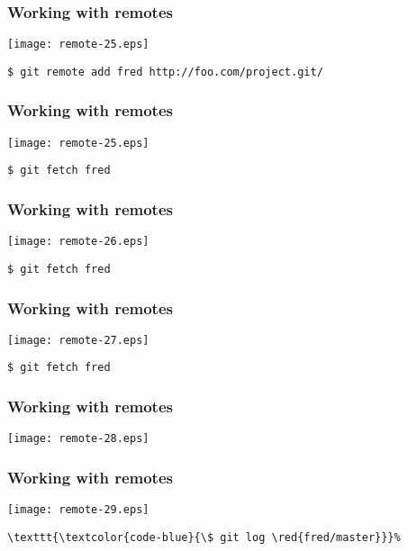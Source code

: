 \documentclass[english]{beamer}
\newcommand{\CMD}[1]{%
\texttt{\textcolor{code-blue}{#1}}%
}
\newcommand{\red}[1]{%
\textcolor{code-red}{#1}%
}
\begin{document}
\begin{frame}[fragile]
\frametitle{Working with remotes}

\texttt{[image: remote-25.eps]}

\CMD{\$ git remote add \red{fred} http://foo.com/project.git/}
\vspace{\textheight}
\end{frame}

\begin{frame}[fragile]
\frametitle{Working with remotes}

\texttt{[image: remote-25.eps]}

\CMD{\$ git fetch \red{fred}}
\vspace{\textheight}
\end{frame}

\begin{frame}[fragile]
\frametitle{Working with remotes}

\texttt{[image: remote-26.eps]}

\CMD{\$ git fetch \red{fred}}
\vspace{\textheight}
\end{frame}

\begin{frame}[fragile]
\frametitle{Working with remotes}

\texttt{[image: remote-27.eps]}

\CMD{\$ git fetch \red{fred}}
\vspace{\textheight}
\end{frame}

\begin{frame}[fragile]
\frametitle{Working with remotes}

\texttt{[image: remote-28.eps]}

\vspace{\textheight}
\end{frame}

\begin{frame}[fragile]
\frametitle{Working with remotes}

\texttt{[image: remote-29.eps]}

\begin{Verbatim}[commandchars=\\\{\}]
\CMD{\$ git log \red{fred/master}}
\end{Verbatim}

\vspace{\textheight}
\end{frame}
\end{document}
